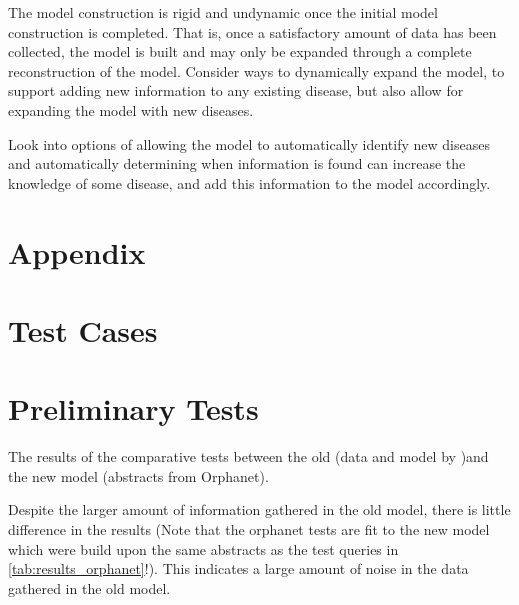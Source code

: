 \documentclass[10pt,letterpaper,final]{article}
\begin{document}
The model construction is rigid and undynamic once the initial model
construction is completed. That is, once a satisfactory amount of data
has been collected, the model is built and may only be expanded through
a complete reconstruction of the model. Consider ways to dynamically
expand the model, to support adding new information to any existing
disease, but also allow for expanding the model with new diseases.

Look into options of allowing the model to automatically identify new
diseases and automatically determining when information is found can
increase the knowledge of some disease, and add this information to the
model accordingly.


\renewcommand\bibname{References}



\appendix
\section{Appendix}
\label{app:orphanet}

\section{Test Cases}

\section{Preliminary Tests}
\label{app:preliminary_results}

The results of the comparative tests between the old (data and model by
\cite{jensenandersen})and the new model (abstracts from Orphanet).

Despite the larger amount of information gathered in the old model,
there is little difference in the results (Note that the orphanet tests
are fit to the new model which were build upon the same abstracts
as the test queries in \ref{tab:results_orphanet}!). This indicates a
large amount of noise in the data gathered in the old model.

\newpage
\end{document}
